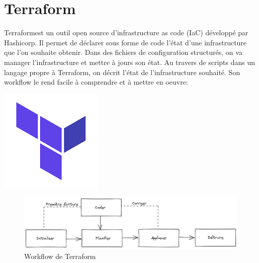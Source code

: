 \documentclass[12pt, a4paper, twoside]{article}
\begin{document}
\section{Terraform}
\noindent%
\begin{minipage}{.7\textwidth}%
\gls{Terraform}est un outil open source d'infrastructure as code (\gls{IaC}) développé par Hashicorp. 
Il permet de déclarer sous forme de code l'état d'une infrastructure que l'on souhaite obtenir. 
Dans des fichiers de configuration structurés, on va manager l'infrastructure et mettre à jours son état.
Au travers de scripts dans un langage propre à \gls{Terraform}, on décrit l'état de l'infrastructure souhaité. 
Son workflow le rend facile à comprendre et à mettre en oeuvre: 
\end{minipage}%
\hfill
\begin{minipage}{.3\textwidth}%
\begin{center}
\includegraphics[scale=0.5]{src/logo_terraform.png}
\end{center}
\end{minipage}%

\begin{figure}[!ht]
    \centering
    \includegraphics[width=\textwidth]{src/graph_terraform.png}
    \caption{Workflow de \gls{Terraform}}
    \label{fig:graph_terraform.png}
\end{figure}
\end{document}
